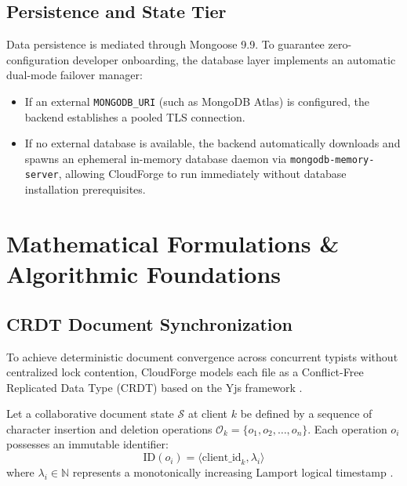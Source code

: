 \documentclass[conference]{IEEEtran}
\begin{document}
\subsection{Persistence and State Tier}
Data persistence is mediated through Mongoose 9.9. To guarantee zero-configuration developer onboarding, the database layer implements an automatic dual-mode failover manager:
\begin{itemize}
    \item If an external \texttt{MONGODB\_URI} (such as MongoDB Atlas) is configured, the backend establishes a pooled TLS connection.
    \item If no external database is available, the backend automatically downloads and spawns an ephemeral in-memory database daemon via \texttt{mongodb-memory-server}, allowing CloudForge to run immediately without database installation prerequisites.
\end{itemize}

\section{Mathematical Formulations \& Algorithmic Foundations}

\subsection{CRDT Document Synchronization}
To achieve deterministic document convergence across concurrent typists without centralized lock contention, CloudForge models each file as a Conflict-Free Replicated Data Type (CRDT) based on the Yjs framework \cite{shapiro2011, nicolaescu2016}.

Let a collaborative document state $\mathcal{S}$ at client $k$ be defined by a sequence of character insertion and deletion operations $\mathcal{O}_k = \{o_1, o_2, \dots, o_n\}$. Each operation $o_i$ possesses an immutable identifier:
\begin{equation}
    \text{ID}(o_i) = \langle \text{client\_id}_k, \lambda_i \rangle
\end{equation}
where $\lambda_i \in \mathbb{N}$ represents a monotonically increasing Lamport logical timestamp \cite{lamport1978}.
\end{document}
